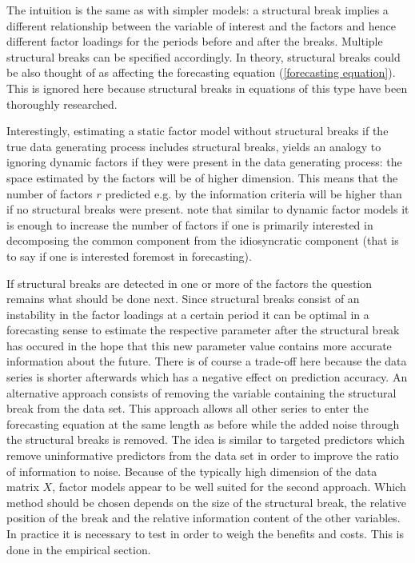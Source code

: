 \documentclass[11pt]{article}
\begin{document}
The intuition is the same as with simpler models: a structural break implies a different relationship between the variable of interest and the factors and hence different factor loadings for the periods before and after the breaks. Multiple structural breaks can be specified accordingly. In theory, structural breaks could be also thought of as affecting the forecasting equation (\ref{forecasting equation}). This is ignored here because structural breaks in equations of this type have been thoroughly researched.


Interestingly, estimating a static factor model without structural breaks if the true data generating process includes structural breaks, yields an analogy to ignoring dynamic factors if they were present in the data generating process: the space estimated by the factors will be of higher dimension. This means that the number of factors $r$ predicted e.g. by the \citet{bai2002determining} information criteria will be higher than if no structural breaks were present. \citet{breitung2011testing} note that similar to dynamic factor models it is enough to increase the number of factors if one is primarily interested in decomposing the common component from the idiosyncratic component (that is to say if one is interested foremost in forecasting).

If structural breaks are detected in one or more of the factors the question remains what should be done next. Since structural breaks consist of an instability in the factor loadings at a certain period it can be optimal in a forecasting sense to estimate the respective parameter after the structural break has occured in the hope that this new parameter value contains more accurate information about the future. There is of course a trade-off here because the data series is shorter afterwards which has a negative effect on prediction accuracy.
An alternative approach consists of removing the variable containing the structural break from the data set. This approach allows all other series to enter the forecasting equation at the same length as before while the added noise through the structural breaks is removed. The idea is similar to targeted predictors which remove uninformative predictors from the data set in order to improve the ratio of information to noise. Because of the typically high dimension of the data matrix $X$, factor models appear to be well suited for the second approach. Which method should be chosen depends on the size of the structural break, the relative position of the break and the relative information content of the other variables. In practice it is necessary to test in order to weigh the benefits and costs. This is done in the empirical section.
\end{document}
